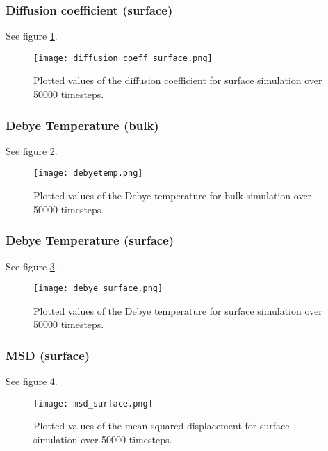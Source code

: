 \subsubsection{Diffusion coefficient (surface)}
See figure \ref{diffsf}.
\begin{figure}[H]
	\centering
	\texttt{[image: diffusion\_coeff\_surface.png]}
	\caption{Plotted values of the diffusion coefficient for surface simulation over 50000 timesteps.}
	\label{diffsf}
\end{figure}


\subsubsection{Debye Temperature (bulk)}
See figure \ref{debye}.
\begin{figure}[H]
	\centering
	\texttt{[image: debyetemp.png]}
	\caption{Plotted values of the Debye temperature for bulk simulation over 50000 timesteps.}
	\label{debye}
\end{figure}

\subsubsection{Debye Temperature (surface)}
See figure \ref{debyesf}.
\begin{figure}[H]
	\centering
	\texttt{[image: debye\_surface.png]}
	\caption{Plotted values of the Debye temperature for surface simulation over 50000 timesteps.}
	\label{debyesf}
\end{figure}

\subsubsection{MSD (surface)}
See figure \ref{msdsf}.
\begin{figure}[H]
	\centering
	\texttt{[image: msd\_surface.png]}
	\caption{Plotted values of the mean squared displacement for surface simulation over 50000 timesteps.}
	\label{msdsf}
\end{figure}


